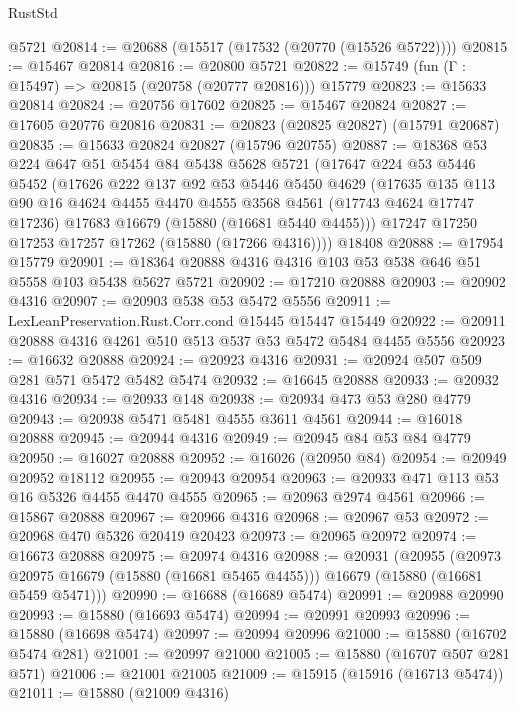 \begin{lexlean}{RustStd}
\begin{coremodule}
    @5721
@20814 := @20688 (@15517 (@17532 (@20770 (@15526 @5722))))
@20815 := @15467 @20814
@20816 := @20800 @5721
@20822 := @15749 (fun (Γ : @15497) => @20815 (@20758 (@20777 @20816))) @15779
@20823 := @15633 @20814
@20824 := @20756 @17602
@20825 := @15467 @20824
@20827 := @17605 @20776 @20816
@20831 := @20823 (@20825 @20827) (@15791 @20687)
@20835 := @15633 @20824 @20827 (@15796 @20755)
@20887 := @18368
    @53
    @224
    @647
    @51
    @5454
    @84
    @5438
    @5628
    @5721
    (@17647
      @224
      @53
      @5446
      @5452
      (@17626
        @222
        @137
        @92
        @53
        @5446
        @5450
        @4629
        (@17635
          @135
          @113
          @90
          @16
          @4624
          @4455
          @4470
          @4555
          @3568
          @4561
          (@17743 @4624 @17747 @17236)
          @17683
          @16679
          (@15880 (@16681 @5440 @4455)))
        @17247
        @17250
        @17253
        @17257
        @17262
        (@15880 (@17266 @4316))))
    @18408
@20888 := @17954 @15779
@20901 := @18364 @20888 @4316 @4316 @103 @53 @538 @646 @51 @5558 @103 @5438 @5627 @5721
@20902 := @17210 @20888
@20903 := @20902 @4316
@20907 := @20903 @538 @53 @5472 @5556
@20911 := LexLeanPreservation.Rust.Corr.cond @15445 @15447 @15449
@20922 := @20911 @20888 @4316 @4261 @510 @513 @537 @53 @5472 @5484 @4455 @5556
@20923 := @16632 @20888
@20924 := @20923 @4316
@20931 := @20924 @507 @509 @281 @571 @5472 @5482 @5474
@20932 := @16645 @20888
@20933 := @20932 @4316
@20934 := @20933 @148
@20938 := @20934 @473 @53 @280 @4779
@20943 := @20938 @5471 @5481 @4555 @3611 @4561
@20944 := @16018 @20888
@20945 := @20944 @4316
@20949 := @20945 @84 @53 @84 @4779
@20950 := @16027 @20888
@20952 := @16026 (@20950 @84)
@20954 := @20949 @20952 @18112
@20955 := @20943 @20954
@20963 := @20933 @471 @113 @53 @16 @5326 @4455 @4470 @4555
@20965 := @20963 @2974 @4561
@20966 := @15867 @20888
@20967 := @20966 @4316
@20968 := @20967 @53
@20972 := @20968 @470 @5326 @20419 @20423
@20973 := @20965 @20972
@20974 := @16673 @20888
@20975 := @20974 @4316
@20988 := @20931
    (@20955
      (@20973 @20975 @16679 (@15880 (@16681 @5465 @4455)))
      @16679
      (@15880 (@16681 @5459 @5471)))
@20990 := @16688 (@16689 @5474)
@20991 := @20988 @20990
@20993 := @15880 (@16693 @5474)
@20994 := @20991 @20993
@20996 := @15880 (@16698 @5474)
@20997 := @20994 @20996
@21000 := @15880 (@16702 @5474 @281)
@21001 := @20997 @21000
@21005 := @15880 (@16707 @507 @281 @571)
@21006 := @21001 @21005
@21009 := @15915 (@15916 (@16713 @5474))
@21011 := @15880 (@21009 @4316)

\end{coremodule}
\end{lexlean}
